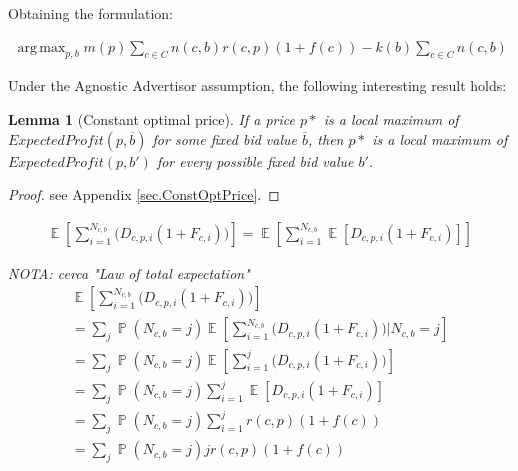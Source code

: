 \documentclass[11pt]{article} %
\DeclareMathOperator{\EX}{\mathbb{E}}
\DeclareMathOperator{\Prob}{\mathbb{P}}
\DeclareMathOperator*{\argmax}{arg\,max}
\newtheorem*{lemma}{Lemma}
\begin{document}
Obtaining the formulation:

\begin{align*}
\argmax_{p,b}{m(p)\sum_{c \in C}{n(c,b)r(c,p)(1+f(c))}-k(b)\sum_{c \in C}{n(c,b)}}
\end{align*}

Under the Agnostic Advertisor assumption, the following interesting result holds:

\begin{lemma}[Constant optimal price]
If a price $p*$ is a local maximum of $ExpectedProfit(p,\overline b)$ for some fixed bid value $\overline b$,  then $p*$ is a local maximum of $ExpectedProfit(p,b')$  for every possible fixed bid value $b'$.
\end{lemma}
\begin{proof}
see Appendix \ref{sec.ConstOptPrice}.
\end{proof}
{\color{red}
\begin{align*}
\EX\left[\sum_{i =1}^{N_{c,b}}{\bigg( D_{c,p,i}(1+F_{c,i})\bigg)}\right]=\EX\left[\sum_{i =1}^{N_{c,b}}{\EX[D_{c,p,i}(1+F_{c,i})]}\right]
\end{align*}

\textit{NOTA: cerca "Law of total expectation"}
\begin{align*}
\EX\left[\sum_{i =1}^{N_{c,b}}{\bigg( D_{c,p,i}(1+F_{c,i})\bigg)}\right]\\
=\sum_{j}{\Prob(N_{c,b}=j)\EX\left[\sum_{i =1}^{N_{c,b}}{\bigg( D_{c,p,i}(1+F_{c,i})\bigg)}|N_{c,b}=j\right]}\\
=\sum_{j}{\Prob(N_{c,b}=j)\EX\left[\sum_{i =1}^{j}{\bigg( D_{c,p,i}(1+F_{c,i})\bigg)}\right]}\\
=\sum_{j}{\Prob(N_{c,b}=j)\sum_{i =1}^{j}{\EX\left[ D_{c,p,i}(1+F_{c,i})\right]}}\\
=\sum_{j}{\Prob(N_{c,b}=j)\sum_{i =1}^{j}{ r(c,p)(1+f(c))}}\\
=\sum_{j}{\Prob(N_{c,b}=j) jr(c,p)(1+f(c))}
\end{align*}
}
\end{document}
